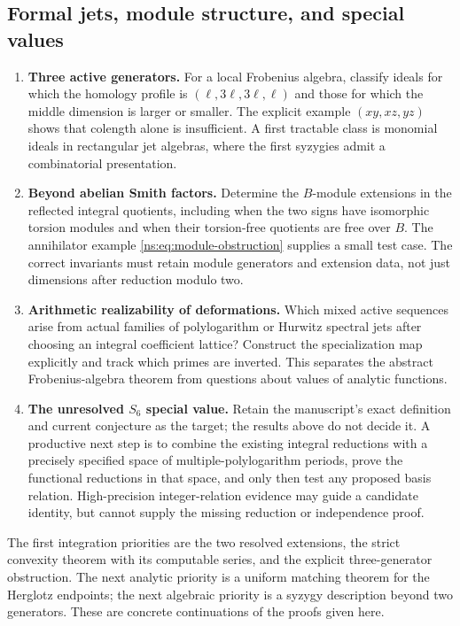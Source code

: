 \subsection{Formal jets, module structure, and special values}
\begin{enumerate}[label=A\arabic*.,leftmargin=*]
\item \textbf{Three active generators.}
For a local Frobenius algebra, classify ideals for which the homology
profile is $(\ell,3\ell,3\ell,\ell)$ and those for which the middle
dimension is larger or smaller. The explicit example
$(xy,xz,yz)$ shows that colength alone is insufficient. A first
tractable class is monomial ideals in rectangular jet algebras, where
the first syzygies admit a combinatorial presentation.

\item \textbf{Beyond abelian Smith factors.}
Determine the $B$-module extensions in the reflected integral quotients,
including when the two signs have isomorphic torsion modules and when
their torsion-free quotients are free over $B$. The annihilator example
\eqref{ns:eq:module-obstruction} supplies a small test case. The correct
invariants must retain module generators and extension data, not just
dimensions after reduction modulo two.

\item \textbf{Arithmetic realizability of deformations.}
Which mixed active sequences arise from actual families of polylogarithm
or Hurwitz spectral jets after choosing an integral coefficient lattice?
Construct the specialization map explicitly and track which primes are
inverted. This separates the abstract Frobenius-algebra theorem from
questions about values of analytic functions.

\item \textbf{The unresolved $S_6$ special value.}
Retain the manuscript's exact definition and current conjecture as the
target; the results above do not decide it. A productive next step is
to combine the existing integral reductions with a precisely specified
space of multiple-polylogarithm periods, prove the functional reductions
in that space, and only then test any proposed basis relation.
High-precision integer-relation evidence may guide a candidate identity,
but cannot supply the missing reduction or independence proof.
\end{enumerate}

The first integration priorities are the two resolved extensions, the
strict convexity theorem with its computable series, and the explicit
three-generator obstruction. The next analytic priority is a uniform
matching theorem for the Herglotz endpoints; the next algebraic priority
is a syzygy description beyond two generators. These are concrete
continuations of the proofs given here.

